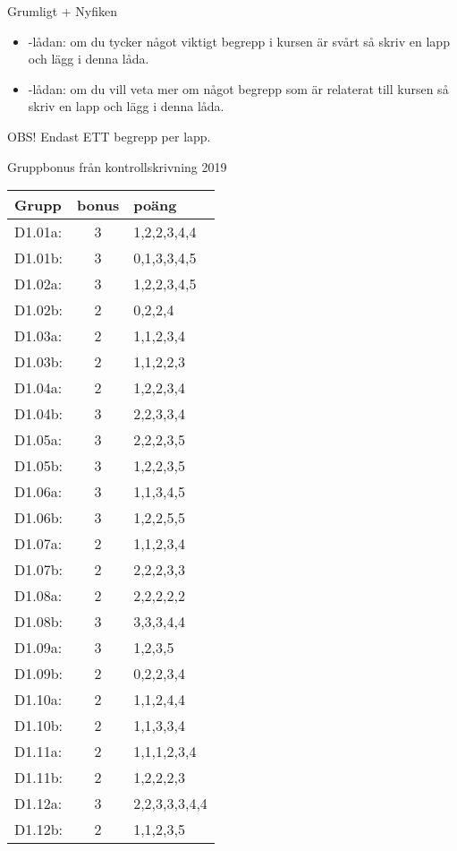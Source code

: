\begin{Slide}{Grumligt + Nyfiken}
    \begin{itemize}
        \item {}-lådan: om du tycker något viktigt begrepp i kursen är svårt så skriv en lapp och lägg i denna låda.
        \item {}-lådan: om du vill veta mer om något begrepp som är relaterat till kursen så skriv en lapp och lägg i denna låda.
    \end{itemize}
    OBS! Endast ETT begrepp per lapp.
\end{Slide}



\begin{Slide}{Gruppbonus från kontrollskrivning 2019} 
\begin{tabular}{l c l}
    Grupp & bonus & poäng \\\hline
D1.01a: & 3 & 1,2,2,3,4,4  \\
D1.01b: & 3 & 0,1,3,3,4,5  \\
D1.02a: & 3 & 1,2,2,3,4,5  \\
D1.02b: & 2 & 0,2,2,4      \\
D1.03a: & 2 & 1,1,2,3,4    \\
D1.03b: & 2 & 1,1,2,2,3    \\
D1.04a: & 2 & 1,2,2,3,4    \\
D1.04b: & 3 & 2,2,3,3,4    \\
D1.05a: & 3 & 2,2,2,3,5    \\
D1.05b: & 3 & 1,2,2,3,5    \\
D1.06a: & 3 & 1,1,3,4,5    \\
D1.06b: & 3 & 1,2,2,5,5    \\
D1.07a: & 2 & 1,1,2,3,4    \\
D1.07b: & 2 & 2,2,2,3,3    \\
D1.08a: & 2 & 2,2,2,2,2    \\
D1.08b: & 3 & 3,3,3,4,4    \\
D1.09a: & 3 & 1,2,3,5      \\
D1.09b: & 2 & 0,2,2,3,4    \\
D1.10a: & 2 & 1,1,2,4,4    \\
D1.10b: & 2 & 1,1,3,3,4    \\
D1.11a: & 2 & 1,1,1,2,3,4  \\
D1.11b: & 2 & 1,2,2,2,3    \\
D1.12a: & 3 & 2,2,3,3,3,4,4\\
D1.12b: & 2 & 1,1,2,3,5    \\
\end{tabular}
\end{Slide} 
\fi

